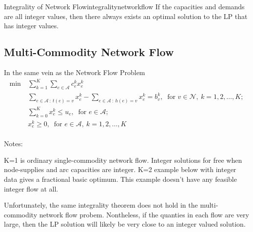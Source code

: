\begin{theorem}{Integrality of Network Flow}{integralitynetworkflow}
If the capacities and demands are all integer values, then there always exists an optimal solution to the LP that has integer values.
\end{theorem}

\subsection{Multi-Commodity Network Flow}
In the same vein as the Network Flow Problem
\begin{align*}
\min~& \sum_{k=1}^{K} \sum_{e \in \mathcal{A}} c^k_e x^k_e \\
&\sum_{e\in \mathcal{A} ~:~ t(e)=v} x^k_e - \sum_{e\in \mathcal{A} ~:~ h(e)=v} x^k_e 
= b^k_v,~ \mbox{ for } v \in \mathcal{N},~ k=1,2,\ldots,K;\\
& \sum_{k=0}^{K}  x^k_{e} \leq u_e,~ \mbox{ for } e \in \mathcal{A};\\
&  x^k_{e}\geq 0,~ \mbox{ for } e \in \mathcal{A},~ k=1,2,\ldots,K\\
\end{align*}

Notes:

K=1 is ordinary single-commodity network flow. Integer solutions for free when node-supplies and arc capacities are integer.
K=2 example below with integer data gives a fractional basic optimum. This example doesn't have any feasible integer flow at all.

\begin{remark}{}{}
Unfortunately, the same integrality theorem does not hold in the multi-commodity network flow probem.  Nontheless, if the quanties in each flow are very large, then the LP solution will likely be very close to an integer valued solution.
\end{remark}
